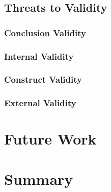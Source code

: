 \documentclass[a4paper,10pt]{article}
\begin{document}
\subsection{Threats to Validity}

\subsubsection{Conclusion Validity}

\subsubsection{Internal Validity}

\subsubsection{Construct Validity}

\subsubsection{External Validity}

\section{Future Work}

\section{Summary}

\newpage



\end{document}
